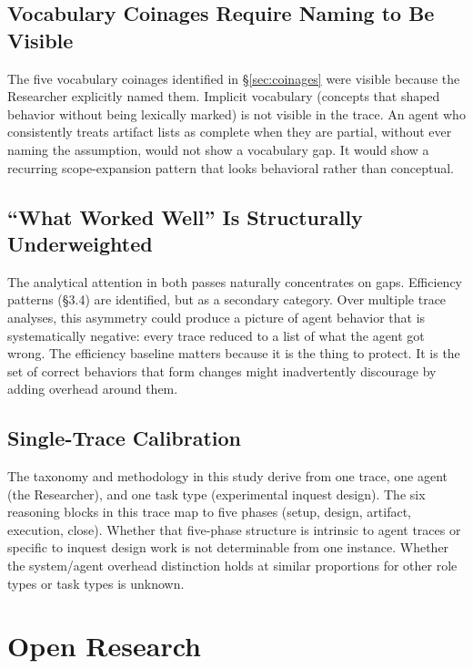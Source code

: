 \documentclass[11pt,a4paper]{article}
\begin{document}
\subsection{Vocabulary Coinages Require Naming to Be Visible}

The five vocabulary coinages identified in \S\ref{sec:coinages} were visible
because the Researcher explicitly named them. Implicit vocabulary (concepts
that shaped behavior without being lexically marked) is not visible in the
trace. An agent who consistently treats artifact lists as complete when they
are partial, without ever naming the assumption, would not show a vocabulary
gap. It would show a recurring scope-expansion pattern that looks behavioral
rather than conceptual.

\subsection{``What Worked Well'' Is Structurally Underweighted}

The analytical attention in both passes naturally concentrates on gaps.
Efficiency patterns (\S3.4) are identified, but as a secondary category.
Over multiple trace analyses, this asymmetry could produce a picture of agent
behavior that is systematically negative: every trace reduced to a list of
what the agent got wrong. The efficiency baseline matters because it is the
thing to protect. It is the set of correct behaviors that form changes might
inadvertently discourage by adding overhead around them.

\subsection{Single-Trace Calibration}
\label{sec:single-trace}

The taxonomy and methodology in this study derive from one trace, one agent
(the Researcher), and one task type (experimental inquest design). The six
reasoning blocks in this trace map to five phases (setup, design, artifact,
execution, close). Whether that five-phase structure is intrinsic to agent
traces or specific to inquest design work is not determinable from one
instance. Whether the system/agent overhead distinction holds at similar
proportions for other role types or task types is unknown.

\section{Open Research}
\end{document}
